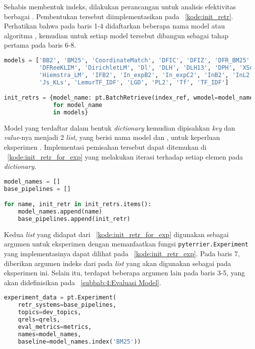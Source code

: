 Sehabis membentuk indeks, dilakukan perancangan \pipeline{} untuk analisis efektivitas berbagai \base{} \retriever{}. Pembentukan \pipeline{} tersebut diimplementasikan pada \kode{}~\ref{kode:init_retr}. Perhatikan bahwa pada baris 1-4 didaftarkan beberapa nama model atau algoritma \base{} \retrieval{}, kemudian untuk setiap model tersebut dibangun \pipeline{} \retrieval{} sebagai tahap \ranking{} pertama pada baris 6-8.
\begin{lstlisting}[language=Python, caption={Pembentukan \textit{Base retriever pipelines}}, label={kode:init_retr}]
models = ['BB2', 'BM25', 'CoordinateMatch', 'DFIC', 'DFIZ', 'DFR_BM25', 'DFRee',
          'DFReeKLIM', 'DirichletLM', 'Dl', 'DLH', 'DLH13', 'DPH', 'XSqrA_M',
          'Hiemstra_LM', 'IFB2', 'In_expB2', 'In_expC2', 'InB2', 'InL2',
          'Js_KLs', 'LemurTF_IDF', 'LGD', 'PL2', 'Tf', 'TF_IDF']

init_retrs = {model_name: pt.BatchRetrieve(index_ref, wmodel=model_name)
              for model_name
              in models}
\end{lstlisting}

Model yang terdaftar dalam bentuk \textit{dictionary} kemudian dipisahkan \textit{key} dan \textit{value}-nya menjadi 2 \textit{list}, yang berisi nama model dan \pipeline{}, untuk keperluan eksperimen \retrieval{}. Implementasi pemisahan tersebut dapat ditemukan di \kode{}~\ref{kode:init_retr_for_exp} yang melakukan iterasi terhadap setiap elemen pada \textit{dictionary}.
\begin{lstlisting}[language=Python, caption={Persiapan \textit{base retriever pipelines} untuk Eksperimen}, label={kode:init_retr_for_exp}]
model_names = []
base_pipelines = []

for name, init_retr in init_retrs.items():
    model_names.append(name)
    base_pipelines.append(init_retr)
\end{lstlisting}

Kedua \textit{list} yang didapat dari \kode{}~\ref{kode:init_retr_for_exp} digunakan sebagai argumen untuk eksperimen dengan memanfaatkan fungsi \lstinline{pyterrier.Experiment} yang implementasinya dapat dilihat pada \kode{}~\ref{kode:init_retr_exp}. Pada baris 7, diberikan argumen indeks dari \obm{} pada \textit{list} yang akan digunakan sebagai \baseline{} pada eksperimen ini. Selain itu, terdapat beberapa argumen lain pada baris 3-5, yang akan didefinisikan pada \subbab{}~\ref{subbab:4:Evaluasi Model}.
\begin{lstlisting}[language=Python, caption={Eksperimen berbagai model atau algoritma \base{} \retrieval{}}, label={kode:init_retr_exp}]
experiment_data = pt.Experiment(
    retr_systems=base_pipelines,
    topics=dev_topics,
    qrels=qrels,
    eval_metrics=metrics,
    names=model_names,
    baseline=model_names.index('BM25'))
\end{lstlisting}

